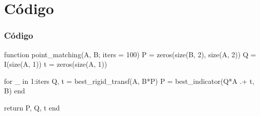 
\section{Código}

\begin{frame}[fragile]
  \frametitle{Código}
  \begin{code}
    function point_matching(A, B; iters = 100)
      P = zeros(size(B, 2), size(A, 2))
      Q = I(size(A, 1))
      t = zeros(size(A, 1))

      for _ in 1:iters
        Q, t = best_rigid_transf(A, B*P)
        P = best_indicator(Q*A .+ t, B)
      end

      return P, Q, t
    end
  \end{code}
\end{frame}
